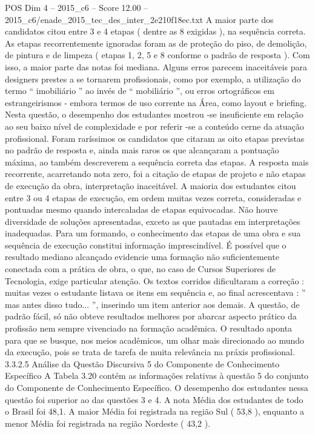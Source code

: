 \begin{textsample}{POS Dim 4 – 2015\_c6 – Score 12.00 – 2015\_c6/enade\_2015\_tec\_des\_inter\_2e210f18ec.txt}
A maior parte dos candidatos citou entre 3 e 4 etapas ( dentre as 8 exigidas ), na sequência correta.
As etapas recorrentemente ignoradas foram as de proteção do piso, de demolição, de pintura e de limpeza ( etapas 1, 2, 5 e 8 conforme o padrão de resposta ).
Com isso, a maior parte das notas foi mediana.
Alguns erros parecem inaceitáveis para designers prestes a se tornarem profissionais, como por exemplo, a utilização do termo “ imobiliário ” ao invés de “ mobiliário ”, ou erros ortográficos em estrangeirismos - embora termos de uso corrente na Área, como layout e briefing.
Nesta questão, o desempenho dos estudantes mostrou -se insuficiente em relação ao seu baixo nível de complexidade e por referir -se a conteúdo cerne da atuação profissional.
Foram raríssimos os candidatos que citaram as oito etapas previstas no padrão de resposta e, ainda mais raros os que alcançaram a pontuação máxima, ao também descreverem a sequência correta das etapas.
A resposta mais recorrente, acarretando nota zero, foi a citação de etapas de projeto e não etapas de execução da obra, interpretação inaceitável.
A maioria dos estudantes citou entre 3 ou 4 etapas de execução, em ordem muitas vezes correta, consideradas e pontuadas mesmo quando intercaladas de etapas equivocadas.
Não houve diversidade de soluções apresentadas, exceto as que pautadas em interpretações inadequadas.
Para um formando, o conhecimento das etapas de uma obra e sua sequência de execução constitui informação imprescindível.
É possível que o resultado mediano alcançado evidencie uma formação não suficientemente conectada com a prática de obra, o que, no caso de Cursos Superiores de Tecnologia, exige particular atenção.
Os textos corridos dificultaram a correção : muitas vezes o estudante listava os itens em sequência e, ao final acrescentava : ” mas antes disso tudo... ”, inserindo um item anterior aos demais.
A questão, de padrão fácil, só não obteve resultados melhores por abarcar aspecto prático da profissão nem sempre vivenciado na formação acadêmica.
O resultado aponta para que se busque, nos meios acadêmicos, um olhar mais direcionado ao mundo da execução, pois se trata de tarefa de muita relevância na práxis profissional. 3.3.2.5 Análise da Questão Discursiva 5 do Componente de Conhecimento Específico A Tabela 3.20 contém as informações relativas à questão 5 do conjunto do Componente de Conhecimento Específico.
O desempenho dos estudantes nessa questão foi superior ao das questões 3 e 4.
A nota Média dos estudantes de todo o Brasil foi 48,1.
A maior Média foi registrada na região Sul ( 53,8 ), enquanto a menor Média foi registrada na região Nordeste ( 43,2 ).

\end{textsample}
